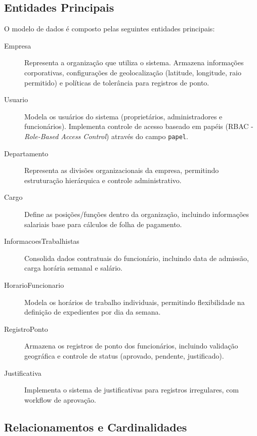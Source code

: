 \subsection{Entidades Principais}

O modelo de dados é composto pelas seguintes entidades principais:

\begin{description}
    \item[Empresa] Representa a organização que utiliza o sistema. Armazena informações corporativas, configurações de geolocalização (latitude, longitude, raio permitido) e políticas de tolerância para registros de ponto.
    
    \item[Usuario] Modela os usuários do sistema (proprietários, administradores e funcionários). Implementa controle de acesso baseado em papéis (RBAC - \textit{Role-Based Access Control}) através do campo \texttt{papel}.
    
    \item[Departamento] Representa as divisões organizacionais da empresa, permitindo estruturação hierárquica e controle administrativo.
    
    \item[Cargo] Define as posições/funções dentro da organização, incluindo informações salariais base para cálculos de folha de pagamento.
    
    \item[InformacoesTrabalhistas] Consolida dados contratuais do funcionário, incluindo data de admissão, carga horária semanal e salário.
    
    \item[HorarioFuncionario] Modela os horários de trabalho individuais, permitindo flexibilidade na definição de expedientes por dia da semana.
    
    \item[RegistroPonto] Armazena os registros de ponto dos funcionários, incluindo validação geográfica e controle de status (aprovado, pendente, justificado).
    
    \item[Justificativa] Implementa o sistema de justificativas para registros irregulares, com workflow de aprovação.
\end{description}

\subsection{Relacionamentos e Cardinalidades}

